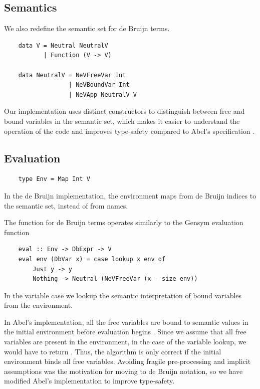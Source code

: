 \subsection{Semantics}

We also redefine the semantic set for de Bruijn terms.

\begin{lstlisting}
    data V = Neutral NeutralV
           | Function (V -> V)

    data NeutralV = NeVFreeVar Int
                  | NeVBoundVar Int
                  | NeVApp NeutralV V
\end{lstlisting}

Our implementation uses distinct constructors to distinguish between free and bound variables in the semantic set, which makes it easier to understand the operation of the code and improves type-safety compared to Abel's specification \cite{deBruijn}.


\subsection{Evaluation}

\begin{lstlisting}
    type Env = Map Int V
\end{lstlisting}

In the de Bruijn implementation, the environment maps from de Bruijn indices to the semantic set, instead of from names.

The  function for de Bruijn terms operates similarly to the Gensym evaluation function

\begin{lstlisting}
    eval :: Env -> DbExpr -> V
    eval env (DbVar x) = case lookup x env of
        Just y -> y
        Nothing -> Neutral (NeVFreeVar (x - size env))
\end{lstlisting}

In the variable case we lookup the semantic interpretation of bound variables from the environment. 

In Abel's implementation, all the free variables are bound to semantic values in the initial environment before evaluation begins \cite{deBruijn}. Since we assume that all free variables are present in the environment, in the  case of the variable lookup, we would have to return . Thus, the algorithm is only correct if the initial environment binds all free variables. Avoiding fragile pre-processing and implicit assumptions was the motivation for moving to de Bruijn notation, so we have modified Abel's implementation to improve type-safety.


